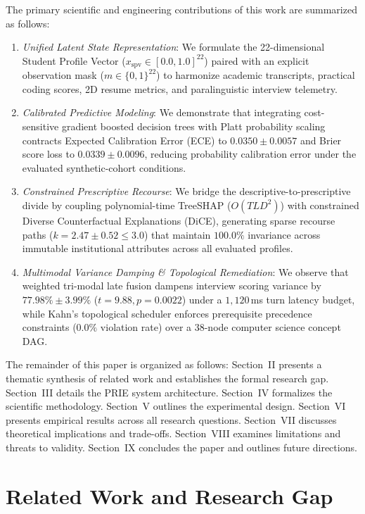 \documentclass[conference]{IEEEtran}
\begin{document}
The primary scientific and engineering contributions of this work are summarized as follows:
\begin{enumerate}
\item \textit{Unified Latent State Representation}: We formulate the 22-dimensional Student Profile Vector ($x_{\text{spv}} \in [0.0, 1.0]^{22}$) paired with an explicit observation mask ($m \in \{0, 1\}^{22}$) to harmonize academic transcripts, practical coding scores, 2D resume metrics, and paralinguistic interview telemetry.
\item \textit{Calibrated Predictive Modeling}: We demonstrate that integrating cost-sensitive gradient boosted decision trees with Platt probability scaling contracts Expected Calibration Error (ECE) to $0.0350 \pm 0.0057$ and Brier score loss to $0.0339 \pm 0.0096$, reducing probability calibration error under the evaluated synthetic-cohort conditions.
\item \textit{Constrained Prescriptive Recourse}: We bridge the descriptive-to-prescriptive divide by coupling polynomial-time TreeSHAP ($O(TLD^2)$) with constrained Diverse Counterfactual Explanations (DiCE), generating sparse recourse paths ($k = 2.47 \pm 0.52 \le 3.0$) that maintain $100.0\%$ invariance across immutable institutional attributes across all evaluated profiles.
\item \textit{Multimodal Variance Damping \& Topological Remediation}: We observe that weighted tri-modal late fusion dampens interview scoring variance by $77.98\% \pm 3.99\%$ ($t = 9.88, p = 0.0022$) under a $1,120$\,ms turn latency budget, while Kahn's topological scheduler enforces prerequisite precedence constraints ($0.0\%$ violation rate) over a 38-node computer science concept DAG.
\end{enumerate}

The remainder of this paper is organized as follows: Section~II presents a thematic synthesis of related work and establishes the formal research gap. Section~III details the PRIE system architecture. Section~IV formalizes the scientific methodology. Section~V outlines the experimental design. Section~VI presents empirical results across all research questions. Section~VII discusses theoretical implications and trade-offs. Section~VIII examines limitations and threats to validity. Section~IX concludes the paper and outlines future directions.

\section{Related Work and Research Gap}
\end{document}
